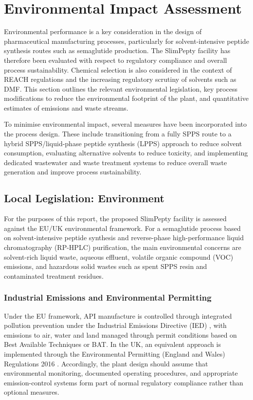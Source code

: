 \section{Environmental Impact Assessment}

Environmental performance is a key consideration in the design of pharmaceutical manufacturing processes, particularly for solvent-intensive peptide synthesis routes such as semaglutide production. The SlimPepty facility has therefore been evaluated with respect to regulatory compliance and overall process sustainability. Chemical selection is also considered in the context of REACH regulations and the increasing regulatory scrutiny of solvents such as DMF. This section outlines the relevant environmental legislation, key process modifications to reduce the environmental footprint of the plant, and quantitative estimates of emissions and waste streams.

To minimise environmental impact, several measures have been incorporated into the process design. These include transitioning from a fully SPPS route to a hybrid SPPS/liquid-phase peptide synthesis (LPPS) approach to reduce solvent consumption, evaluating alternative solvents to reduce toxicity, and implementing dedicated wastewater and waste treatment systems to reduce overall waste generation and improve process sustainability.

\subsection{Local Legislation: Environment}

For the purposes of this report, the proposed SlimPepty facility is assessed against the EU/UK environmental framework. For a semaglutide process based on solvent-intensive peptide synthesis and reverse-phase high-performance liquid chromatography (RP-HPLC) purification, the main environmental concerns are solvent-rich liquid waste, aqueous effluent, volatile organic compound (VOC) emissions, and hazardous solid wastes such as spent SPPS resin and contaminated treatment residues.

\subsubsection{Industrial Emissions and Environmental Permitting}

Under the EU framework, API manufacture is controlled through integrated pollution prevention under the Industrial Emissions Directive (IED) \cite{EU_IED_2010}, with emissions to air, water and land managed through permit conditions based on Best Available Techniques or BAT. In the UK, an equivalent approach is implemented through the Environmental Permitting (England and Wales) Regulations 2016 \cite{UK_EPR_2016}. Accordingly, the plant design should assume that environmental monitoring, documented operating procedures, and appropriate emission-control systems form part of normal regulatory compliance rather than optional measures.

